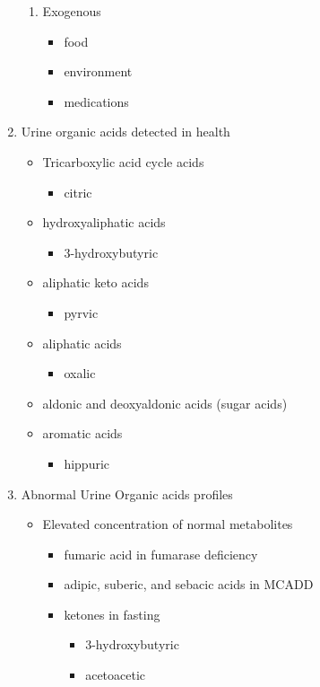 \documentclass{scrartcl}
\begin{document}
\begin{enumerate}
\begin{enumerate}
\item Exogenous
\label{sec:org94c94a1}
\begin{itemize}
\item food
\item environment
\item medications
\end{itemize}
\end{enumerate}

\item Urine organic acids detected in health
\label{sec:orgedc5ca0}

\begin{itemize}
\item Tricarboxylic acid cycle acids
\begin{itemize}
\item citric
\end{itemize}
\item hydroxyaliphatic acids
\begin{itemize}
\item 3-hydroxybutyric
\end{itemize}
\item aliphatic keto acids
\begin{itemize}
\item pyrvic
\end{itemize}
\item aliphatic acids
\begin{itemize}
\item oxalic
\end{itemize}
\item aldonic and deoxyaldonic acids (sugar acids)
\item aromatic acids
\begin{itemize}
\item hippuric
\end{itemize}
\end{itemize}

\item Abnormal Urine Organic acids profiles
\label{sec:orgf6ab0a0}
\begin{itemize}
\item Elevated concentration of normal metabolites
\begin{itemize}
\item fumaric acid in fumarase deficiency
\item adipic, suberic, and sebacic acids in MCADD
\item ketones in fasting
\begin{itemize}
\item 3-hydroxybutyric
\item acetoacetic
\end{itemize}
\end{itemize}


\end{itemize}
\end{enumerate}
\end{document}
